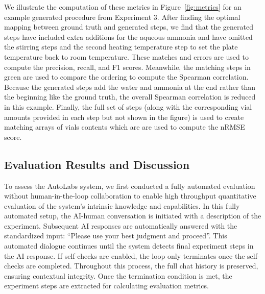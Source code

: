 \documentclass[sn-nature, twocolumn]{sn-jnl}%
\theoremstyle{thmstyleone}%
\theoremstyle{thmstyletwo}%
\theoremstyle{thmstylethree}%
\begin{document}
We illustrate the computation of these metrics in Figure~\ref{fig:metrics} for an example generated procedure from Experiment 3. After finding the optimal mapping between ground truth and generated steps, we find that the generated steps have included extra additions for the aqueous ammonia and have omitted the stirring steps and the second heating temperature step to set the plate temperature back to room temperature. These matches and errors are used to compute the precision, recall, and F1 scores. Meanwhile, the matching steps in green are used to compare the ordering to compute the Spearman correlation. Because the generated steps add the water and ammonia at the end rather than the beginning like the ground truth, the overall Spearman correlation is reduced in this example. Finally, the full set of steps (along with the corresponding vial amounts provided in each step but not shown in the figure) is used to create matching arrays of vials contents which are are used to compute the nRMSE score.



\subsection{Evaluation Results and Discussion}

To assess the AutoLabs system, we first conducted a fully automated evaluation without human-in-the-loop collaboration to enable high throughput quantitative evaluation of the system's intrinsic knowledge and capabilities. In this fully automated setup, the AI-human conversation is initiated with a description of the experiment. Subsequent AI responses are automatically answered with the standardized input: ``Please use your best judgment and proceed''. This automated dialogue continues until the system detects final experiment steps in the AI response. If self-checks are enabled, the loop only terminates once the self-checks are completed. Throughout this process, the full chat history is preserved, ensuring contextual integrity. Once the termination condition is met, the experiment steps are extracted for calculating evaluation metrics.
\end{document}
